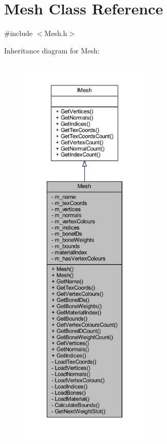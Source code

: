 \hypertarget{class_mesh}{}\section{Mesh Class Reference}
\label{class_mesh}


{\ttfamily \#include $<$Mesh.\+h$>$}



Inheritance diagram for Mesh\+:\nopagebreak
\begin{figure}[H]
\begin{center}
\leavevmode
\includegraphics[height=550pt]{class_mesh__inherit__graph}
\end{center}
\end{figure}


